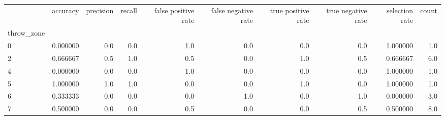 \begin{tabular}{lrrrrrrrrr}
\toprule
{} &  accuracy &  precision &  recall &  false positive rate &  false negative rate &  true positive rate &  true negative rate &  selection rate &  count \\
throw\_zone &           &            &         &                      &                      &                     &                     &                 &        \\
\midrule
0          &  0.000000 &        0.0 &     0.0 &                  1.0 &                  0.0 &                 0.0 &                 0.0 &        1.000000 &    1.0 \\
2          &  0.666667 &        0.5 &     1.0 &                  0.5 &                  0.0 &                 1.0 &                 0.5 &        0.666667 &    6.0 \\
4          &  0.000000 &        0.0 &     0.0 &                  1.0 &                  0.0 &                 0.0 &                 0.0 &        1.000000 &    1.0 \\
5          &  1.000000 &        1.0 &     1.0 &                  0.0 &                  0.0 &                 1.0 &                 0.0 &        1.000000 &    1.0 \\
6          &  0.333333 &        0.0 &     0.0 &                  0.0 &                  1.0 &                 0.0 &                 1.0 &        0.000000 &    3.0 \\
7          &  0.500000 &        0.0 &     0.0 &                  0.5 &                  0.0 &                 0.0 &                 0.5 &        0.500000 &    8.0 \\
\bottomrule
\end{tabular}
